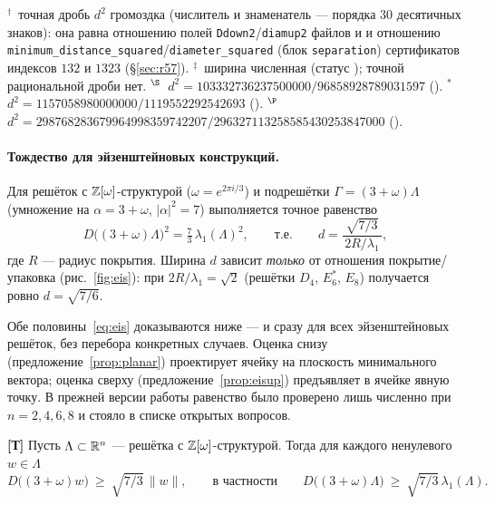 \begin{center}
\smallskip
\begin{minipage}{0.92\textwidth}\footnotesize
$^{\dagger}$~точная дробь $d^2$ громоздка (числитель и знаменатель --- порядка
$30$ десятичных знаков): она равна отношению полей
\texttt{Ddown2}/\texttt{diamup2} файлов 
и  и отношению
\texttt{minimum\_distance\_squared}/\texttt{diameter\_squared} (блок
\texttt{separation}) сертификатов индексов $132$ и $1323$ (\S\ref{sec:r57}).\quad
$^{\ddagger}$~ширина численная (статус \stN); точной рациональной дроби нет.\quad
$^{\S}$~$d^2=103332736237500000/96858928789031597$
().\quad
$^{\ast}$~$d^2=1157058980000000/1119552292542693$
().\quad
$^{\P}$~$d^2=298768283679964998359742207/296327113258585430253847000$
().
\end{minipage}
\end{center}

\paragraph{Тождество для эйзенштейновых конструкций.} Для решёток с
$\mathbb{Z}[\omega]$-структурой ($\omega=e^{2\pi i/3}$) и подрешётки
$\Gamma=(3+\omega)\Lambda$ (умножение на $\alpha=3+\omega$, $|\alpha|^2=7$)
выполняется точное равенство
\begin{equation}\label{eq:eis}
D\bigl((3+\omega)\Lambda\bigr)^2=\tfrac73\,\lambda_1(\Lambda)^2,
\qquad\text{т.е.}\qquad
d=\frac{\sqrt{7/3}}{\,2R/\lambda_1\,},
\end{equation}
где $R$ --- радиус покрытия. Ширина $d$ зависит \emph{только} от отношения
покрытие/упаковка (рис.~\ref{fig:eis}): при $2R/\lambda_1=\sqrt2$ (решётки
$D_4$, $E_6^*$, $E_8$) получается ровно $d=\sqrt{7/6}$.

Обе половины~\eqref{eq:eis} доказываются ниже --- и сразу для всех
эйзенштейновых решёток, без перебора конкретных случаев. Оценка снизу
(предложение~\ref{prop:planar}) проектирует ячейку на плоскость минимального
вектора; оценка сверху (предложение~\ref{prop:eisup}) предъявляет в ячейке
явную точку. В прежней версии работы равенство было проверено лишь численно
при $n=2,4,6,8$ и стояло в списке открытых вопросов.

\begin{proposition}\label{prop:planar}
\textbf{[Т]} Пусть $\Lambda\subset\mathbb{R}^n$ --- решётка с $\mathbb{Z}[\omega]$-структурой.
Тогда для каждого ненулевого $w\in\Lambda$
\[
D\bigl((3+\omega)w\bigr)\ \ge\ \sqrt{7/3}\,\|w\|,
\qquad\text{в частности}\qquad
D\bigl((3+\omega)\Lambda\bigr)\ \ge\ \sqrt{7/3}\,\lambda_1(\Lambda).
\]
\end{proposition}

